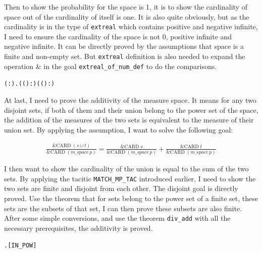 \documentclass{article}
\begin{document}
Then to show the probability for the space is 1, it is to show the cardinality of space out of the cardinality of itself
is one. It is also quite obviously, but as the cardinality is in the type of \verb|extreal| which contains positive and
negative infinite, I need to ensure the cardinality of the space is not 0, positive infinite and negative infinite. It
can be directly proved by the assumptions that space is a finite and non-empty set. But \verb|extreal| definition is also needed
to expand the operation $\&$ in the goal \verb|extreal_of_num_def| to do the comparisons.

\begin{alltt}
  \HOLTokenTurnstile{} \HOLSymConst{\HOLTokenForall{}}( :). ((\HOLSymConst{\&}) :) \HOLSymConst{=}  ((\HOLSymConst{\&}) :)
\end{alltt}

At last, I need to prove the additivity of the measure space. It means for any two disjoint sets, if both of them
and their union belong to the power set of the space, the addition of the measures of the two sets is equivalent
to the measure of their union set. By applying the assumption, I want to solve the following goal:

\begin{multline*}
\frac{\text{\&CARD} \; (s \cup t)}{\text{\&CARD} \; (m\_space \, p)} = \frac{\text{\&CARD} \; s}{\text{\&CARD} \; (m\_space \, p)} + \frac{\text{\&CARD} \; t}{\text{\&CARD} \; (m\_space \, p)}
\end{multline*}

I then want to show the cardinality of the union is equal to the sum of the two sets. By applying the tacitic
\verb|MATCH_MP_TAC| introduced earlier, I need to show the two sets are finite and disjoint from each other. The disjoint
goal is directly proved. Use the theorem that for sets belong to the power set of a finite set, these sets are the subsets
of that set, I can then prove these subsets are also finite. After some simple conversions, and use the theorem \verb|div_add|
with all the necessary prerequisites, the additivity is proved.

\begin{alltt}
  \HOLTokenTurnstile{} \HOLSymConst{\HOLTokenForall{}} .  \HOLSymConst{\HOLTokenIn{}}   \HOLSymConst{\HOLTokenEquiv{}}  \HOLSymConst{\HOLTokenSubset{}} \hfill{[IN_POW]}
\end{alltt}
\end{document}

